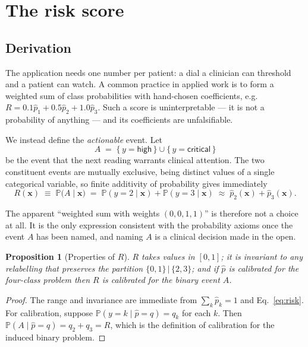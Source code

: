\documentclass[11pt,a4paper]{article}
\newtheorem{proposition}{Proposition}
\newcommand{\Prob}{\mathbb{P}}
\begin{document}
\section{The risk score}
\label{sec:riskscore}

\subsection{Derivation}

The application needs one number per patient: a dial a clinician can threshold and
a patient can watch. A common practice in applied work is to form a weighted sum
of class probabilities with hand-chosen coefficients, e.g.
$R = 0.1\hat p_1 + 0.5 \hat p_2 + 1.0\hat p_3$. Such a score is uninterpretable ---
it is not a probability of anything --- and its coefficients are unfalsifiable.

We instead define the \emph{actionable} event. Let
\[
  A \;=\; \{\,y = \textsf{high}\,\} \cup \{\,y=\textsf{critical}\,\}
\]
be the event that the next reading warrants clinical attention. The two
constituent events are mutually exclusive, being distinct values of a single
categorical variable, so finite additivity of probability gives immediately
\begin{equation}
\label{eq:risk}
  R(\mathbf{x}) \;\equiv\; \Prob\bigl(A \mid \mathbf{x}\bigr)
   \;=\; \Prob(y=2\mid\mathbf{x}) + \Prob(y=3\mid\mathbf{x})
   \;\approx\; \hat p_2(\mathbf{x}) + \hat p_3(\mathbf{x}).
\end{equation}

The apparent ``weighted sum with weights $(0,0,1,1)$'' is therefore not a choice at
all. It is the only expression consistent with the probability axioms once the
event $A$ has been named, and naming $A$ is a clinical decision made in the open.

\begin{proposition}[Properties of $R$]
$R$ takes values in $[0,1]$; it is invariant to any relabelling that preserves the
partition $\{0,1\}\,|\,\{2,3\}$; and if $\hat p$ is calibrated for the four-class
problem then $R$ is calibrated for the binary event $A$.
\end{proposition}

\begin{proof}
The range and invariance are immediate from $\sum_k \hat p_k = 1$ and
Eq.~\eqref{eq:risk}. For calibration, suppose
$\Prob(y=k \mid \hat p = q) = q_k$ for each $k$. Then
$\Prob(A \mid \hat p = q) = q_2 + q_3 = R$, which is the definition of calibration
for the induced binary problem.
\end{proof}
\end{document}
